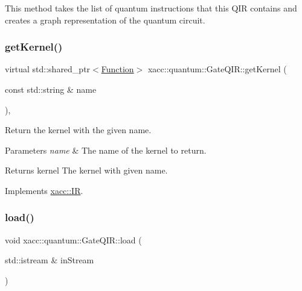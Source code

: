 This method takes the list of quantum instructions that this Q\+IR contains and creates a graph representation of the quantum circuit. \mbox{\label{a01296_a194758b6edcc3ae0c7fe8004f9bfe690}} 
\subsubsection{\texorpdfstring{get\+Kernel()}{getKernel()}}
{\footnotesize\ttfamily virtual std\+::shared\+\_\+ptr$<$\hyperlink{a02456}{Function}$>$ xacc\+::quantum\+::\+Gate\+Q\+I\+R\+::get\+Kernel (\begin{DoxyParamCaption}\item[{const std\+::string \&}]{name }\end{DoxyParamCaption})\hspace{0.3cm}{\ttfamily [inline]}, {\ttfamily [virtual]}}

Return the kernel with the given name.


\begin{DoxyParams}{Parameters}
{\em name} & The name of the kernel to return. \\
\hline
\end{DoxyParams}
\begin{DoxyReturn}{Returns}
kernel The kernel with given name. 
\end{DoxyReturn}


Implements \hyperlink{a02480_a6f49b4ba4b3a15142b04873284885f0d}{xacc\+::\+IR}.

\mbox{\label{a01296_a07f26eeb362ac480d20da6cdc8c8fb39}} 
\subsubsection{\texorpdfstring{load()}{load()}}
{\footnotesize\ttfamily void xacc\+::quantum\+::\+Gate\+Q\+I\+R\+::load (\begin{DoxyParamCaption}\item[{std\+::istream \&}]{in\+Stream }\end{DoxyParamCaption})\hspace{0.3cm}{\ttfamily [virtual]}}

